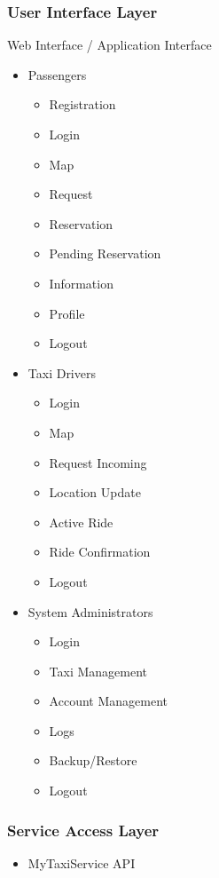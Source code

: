 \documentclass[11pt, a4paper,titlepage]{article}
\begin{document}
	\subsubsection{User Interface Layer}
	Web Interface / Application Interface
	\begin{itemize}
		\item Passengers
		\begin{itemize}
			\item Registration
			\item Login
			\item Map
			\item Request
			\item Reservation
			\item Pending Reservation
			\item Information
			\item Profile
			\item Logout
		\end{itemize}
		\item Taxi Drivers
		\begin{itemize}
			\item Login 
			\item Map
			\item Request Incoming 
			\item Location Update
			\item Active Ride
			\item Ride Confirmation
			\item Logout
		\end{itemize}
		\item  System Administrators
		\begin{itemize}
			\item Login
			\item Taxi Management
			\item Account Management
			\item Logs
			\item Backup/Restore
			\item Logout
		\end{itemize}
	\end{itemize}
	\newpage
	\subsubsection{Service Access Layer}
	\begin{itemize}
		\item MyTaxiService API
	\end{itemize}
\end{document}
